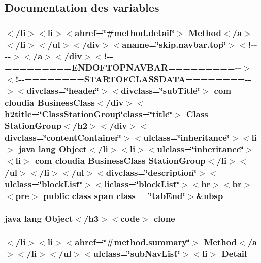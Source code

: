 \subsection{Documentation des variables}
\hypertarget{_station_group_8html_a64bfc3e43fc73228e4c392e35974f1a8}{
\subsubsection[{class}]{\setlength{\rightskip}{0pt plus 5cm}$<$/li$>$$<$li$>$$<$ahref=\char`\"{}\#method.\-detail\char`\"{}$>$ Method$<$/{\bf a}$>$$<$/li$>$$<$/ul$>$$<$/div$>$$<$aname=\char`\"{}skip.\-navbar.\-top\char`\"{}$>$$<$!-\/-\/-\/-\/$>$$<$/a$>$$<$/div$>$$<$!-\/-\/=========E\-N\-D\-O\-F\-T\-O\-P\-N\-A\-V\-B\-A\-R=========-\/-\/$>$$<$!-\/-\/========S\-T\-A\-R\-T\-O\-F\-C\-L\-A\-S\-S\-D\-A\-T\-A========-\/-\/$>$$<$divclass=\char`\"{}header\char`\"{}$>$$<$divclass=\char`\"{}sub\-Title\char`\"{}$>$ com cloudia Business\-Class$<$/div$>$$<$h2title=\char`\"{}Class\-Station\-Group\char`\"{}class=\char`\"{}title\char`\"{}$>$ Class {\bf Station\-Group}$<$/h2$>$$<$/div$>$$<$divclass=\char`\"{}content\-Container\char`\"{}$>$$<$ulclass=\char`\"{}inheritance\char`\"{}$>$$<$li$>$ java lang Object$<$/li$>$$<$li$>$$<$ulclass=\char`\"{}inheritance\char`\"{}$>$$<$li$>$ com cloudia Business\-Class {\bf Station\-Group}$<$/li$>$$<$/ul$>$$<$/li$>$$<$/ul$>$$<$divclass=\char`\"{}description\char`\"{}$>$$<$ulclass=\char`\"{}block\-List\char`\"{}$>$$<$liclass=\char`\"{}block\-List\char`\"{}$>$$<$hr$>$$<$br$>$$<$pre$>$ public class {\bf span} class = \char`\"{}tab\-End\char`\"{}$>$\&nbsp}}\label{_station_group_8html_a64bfc3e43fc73228e4c392e35974f1a8}
\hypertarget{_station_group_8html_adc9607fcabf6f2d7f401ad52015ef6e0}{
\subsubsection[{clone}]{\setlength{\rightskip}{0pt plus 5cm}java lang Object$<$/h3$>$$<$code$>$ clone}}\label{_station_group_8html_adc9607fcabf6f2d7f401ad52015ef6e0}
\hypertarget{_station_group_8html_a1e04b5ec07bcd5281e26dcd40e5b3a94}{
\subsubsection[{Detail}]{\setlength{\rightskip}{0pt plus 5cm}$<$/li$>$$<$li$>$$<$ahref=\char`\"{}\#method.\-summary\char`\"{}$>$ Method$<$/{\bf a}$>$$<$/li$>$$<$/ul$>$$<$ulclass=\char`\"{}sub\-Nav\-List\char`\"{}$>$$<$li$>$ Detail}}\label{_station_group_8html_a1e04b5ec07bcd5281e26dcd40e5b3a94}
